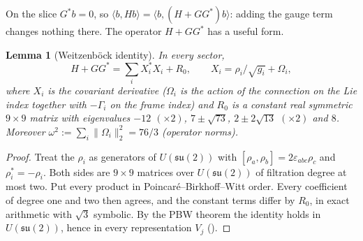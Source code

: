 \documentclass[11pt]{article}
\newtheorem{lemma}[theorem]{Lemma}
\theoremstyle{definition}
\theoremstyle{remark}
\newcommand{\su}{\mathfrak{su}(2)}
\newcommand{\norm}[1]{\lVert #1\rVert}
\begin{document}
On the slice $G^*b=0$, so $\langle b,Hb\rangle=\langle b,(H+GG^*)b\rangle$: adding the gauge term changes
nothing there. The operator $H+GG^*$ has a useful form.

\begin{lemma}[Weitzenb\"ock identity]\label{lem:weitz}
In every sector,
\[
  H+GG^*=\sum_iX_i^*X_i+R_0,\qquad X_i=\rho_i/\sqrt{g_i}+\Omega_i,
\]
where $X_i$ is the covariant derivative ($\Omega_i$ is the action of the connection on the Lie index
together with $-\Gamma_i$ on the frame index) and $R_0$ is a constant real symmetric $9\times9$ matrix
with eigenvalues $-12$ $(\times2)$, $7\pm\sqrt{73}$, $2\pm2\sqrt{13}$ $(\times2)$ and $8$. Moreover
$\omega^2:=\sum_i\norm{\Omega_i}_2^2=76/3$ (operator norms).
\end{lemma}
\begin{proof}
Treat the $\rho_i$ as generators of $U(\su)$ with $[\rho_a,\rho_b]=2\varepsilon_{abc}\rho_c$ and
$\rho_i^*=-\rho_i$. Both sides are $9\times9$ matrices over $U(\su)$ of filtration degree at most two.
Put every product in Poincar\'e--Birkhoff--Witt order. Every coefficient of degree one and two then
agrees, and the constant terms differ by $R_0$, in exact arithmetic with $\sqrt3$ symbolic. By the PBW
theorem the identity holds in $U(\su)$, hence in every representation $V_j$
().
\end{proof}
\end{document}
